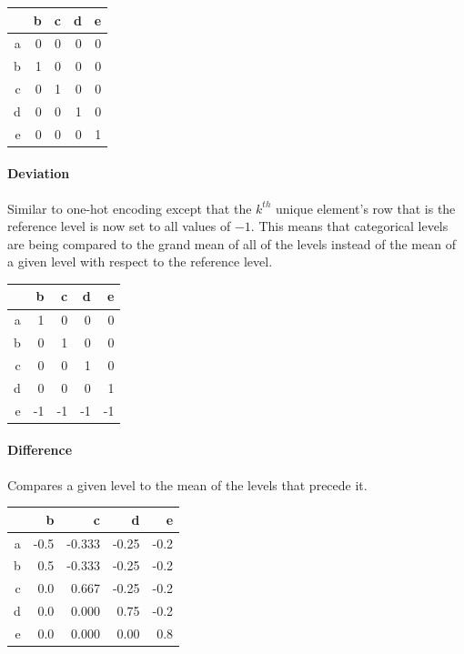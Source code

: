 \documentclass{article}
\theoremstyle{plain}
\theoremstyle{definition}
\theoremstyle{remark}
\begin{document}
\begin{table}[H]
	\centering
	\begin{tabular}{rrrrr}
		\hline
		& b & c & d & e \\
		\hline
		a & 0 & 0 & 0 & 0 \\
		b & 1 & 0 & 0 & 0 \\
		c & 0 & 1 & 0 & 0 \\
		d & 0 & 0 & 1 & 0 \\
		e & 0 & 0 & 0 & 1 \\
		\hline
	\end{tabular}
\end{table}

\paragraph{Deviation} Similar to one-hot encoding except that the $k^{th}$ unique element's row that is the reference level is now set to all values of $-1$. This means that categorical levels are being compared to the grand mean of all of the levels instead of the mean of a given level with respect to the reference level.

\begin{table}[H]
	\centering
	\begin{tabular}{rrrrr}
		\hline
		& b & c & d & e \\
		\hline
		a & 1 & 0 & 0 & 0 \\
		b & 0 & 1 & 0 & 0 \\
		c & 0 & 0 & 1 & 0 \\
		d & 0 & 0 & 0 & 1 \\
		e & -1 & -1 & -1 & -1 \\
		\hline
	\end{tabular}
\end{table}


\paragraph{Difference} Compares a given level to the mean of the levels that precede it.

\begin{table}[H]
	\centering
	\begin{tabular}{rrrrr}
		\hline
		& b & c & d & e \\
		\hline
		a & -0.5 &-0.333& -0.25& -0.2\\
		b &  0.5 &-0.333& -0.25& -0.2\\
		c &  0.0 & 0.667& -0.25& -0.2\\
		d & 0.0 & 0.000 & 0.75 &-0.2\\
		e &  0.0&  0.000&  0.00&  0.8\\
		\hline
	\end{tabular}
\end{table}
\end{document}
